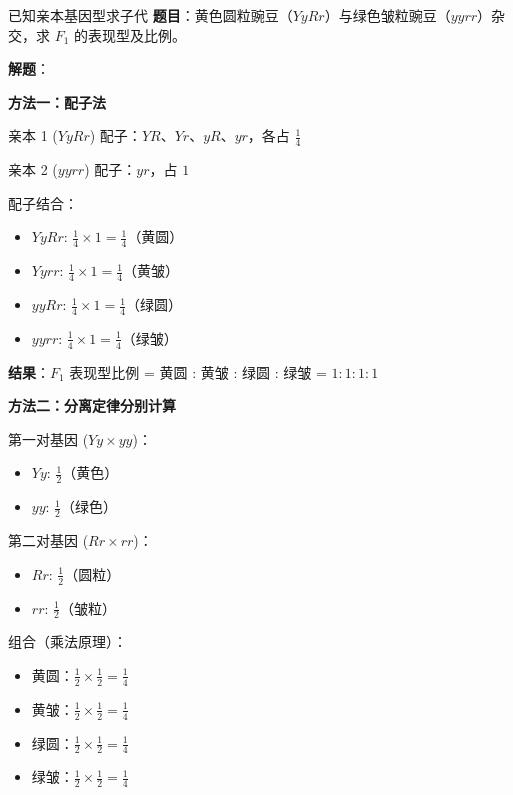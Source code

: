 \documentclass[a4paper,11pt]{ctexart}
\begin{document}
\begin{examplebox}{已知亲本基因型求子代}
\textbf{题目}：黄色圆粒豌豆（$YyRr$）与绿色皱粒豌豆（$yyrr$）杂交，求 $F_1$ 的表现型及比例。

\textbf{解题}：

\textbf{方法一：配子法}

亲本 1 ($YyRr$) 配子：$YR$、$Yr$、$yR$、$yr$，各占 $\frac{1}{4}$

亲本 2 ($yyrr$) 配子：$yr$，占 $1$

配子结合：
\begin{itemize}[leftmargin=2em]
    \item $YyRr$: $\frac{1}{4} \times 1 = \frac{1}{4}$（黄圆）
    \item $Yyrr$: $\frac{1}{4} \times 1 = \frac{1}{4}$（黄皱）
    \item $yyRr$: $\frac{1}{4} \times 1 = \frac{1}{4}$（绿圆）
    \item $yyrr$: $\frac{1}{4} \times 1 = \frac{1}{4}$（绿皱）
\end{itemize}

\textbf{结果}：$F_1$ 表现型比例 = 黄圆 : 黄皱 : 绿圆 : 绿皱 = $1:1:1:1$

\textbf{方法二：分离定律分别计算}

第一对基因 ($Yy \times yy$)：
\begin{itemize}[leftmargin=2em]
    \item $Yy$: $\frac{1}{2}$（黄色）
    \item $yy$: $\frac{1}{2}$（绿色）
\end{itemize}

第二对基因 ($Rr \times rr$)：
\begin{itemize}[leftmargin=2em]
    \item $Rr$: $\frac{1}{2}$（圆粒）
    \item $rr$: $\frac{1}{2}$（皱粒）
\end{itemize}

组合（乘法原理）：
\begin{itemize}[leftmargin=2em]
    \item 黄圆：$\frac{1}{2} \times \frac{1}{2} = \frac{1}{4}$
    \item 黄皱：$\frac{1}{2} \times \frac{1}{2} = \frac{1}{4}$
    \item 绿圆：$\frac{1}{2} \times \frac{1}{2} = \frac{1}{4}$
    \item 绿皱：$\frac{1}{2} \times \frac{1}{2} = \frac{1}{4}$
\end{itemize}
\end{examplebox}
\end{document}
